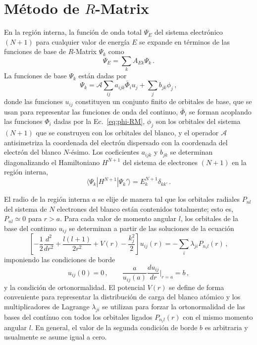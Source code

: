 \chapter{Método de $R$-Matrix}
\label{app:rmatrix}


En la región interna, la función de onda total $\Psi_E$ del sistema 
electrónico $(N+1)$ para cualquier valor de energía $E$ se expande en 
términos de las funciones de base de $R$-Matrix $\Psi_k$ como
\begin{equation}
\Psi_E=\sum_k A_{Ek}\Psi_k\,.
\label{eq:RM-wavefn}
\end{equation}
La funciones de base $\Psi_k$ están dadas por
\begin{equation}
\Psi_k=\mathcal{A}\sum_{ij}a_{ijk}\bar{\Phi}_i u_{j}
+\sum_j b_{jk}\phi_j\,,
\label{eq:RM-basisfn}
\end{equation}
donde las funciones $u_{ij}$ constituyen un conjunto finito de orbitales 
de base, que se usan para representar las funciones de onda del continuo,
$\bar{\Phi}_i$ se forman acoplando las funciones $\Phi_i$ dadas por la 
Ec.~\ref{eq:phi-RM}, $\phi_j$ son los orbitales del sistema $(N+1)$ que 
se construyen con los orbitales del blanco, y el operador $\mathcal{A}$ 
antisimetriza la coordenada del electrón dispersado con la coordenada 
del electrón del blanco $N$-ésimo. Los coeficientes $a_{ijk}$ y $b_{jk}$ 
se determinan diagonalizando el Hamiltoniano $H^{N+1}$ del sistema de 
electrones $(N+1)$ en la región interna,
\begin{equation}
\langle\Psi_k\left|H^{N+1}\right|\Psi_k'\rangle=E_k^{N+1}\delta_{kk'}\,.
\label{eq:RM-N+1Hamilt}
\end{equation}

El radio de la región interna $a$ se elije de manera tal que los 
orbitales radiales $P_{nl}$ del sistema de $N$ electrones del blanco 
están contenidos totalmente; esto es, $P_{nl}\simeq 0$ para $r>a$. Para 
cada valor de momento angular $l$, los orbitales de la base del continuo 
$u_{ij}$ se determinan a partir de las soluciones de la ecuación
\begin{equation}
\left[-\frac{1}{2}\frac{d^2}{dr^2}+\frac{l(l+1)}{2r^2}+V(r)
-\frac{k_j^2}{2}\right]u_{ij}(r)=-\sum_i\lambda_{ji}P_{n_il}(r)\,,
\label{eq:RM-difeq-uj}
\end{equation}
imponiendo las condiciones de borde 
\begin{equation}
u_{ij}(0)=0\,,\qquad\frac{a}{u_{ij}(a)}\frac{du_{ij}}{dr}\bigg|_{r=a}=b\,,
\end{equation}
y la condición de ortonormalidad.
El potencial $V(r)$ se define de forma conveniente para representar la
distribución de carga del blanco atómico y los multiplicadores de 
Lagrange $\lambda_{ji}$ se utilizan para forzar la ortonormalidad de las
bases del contínuo con todos los orbitales ligados $P_{n_il}(r)$ con el
mismo momento angular $l$. En general, el valor de la segunda condición 
de borde $b$ es arbitraria y usualmente se asume igual a cero.

